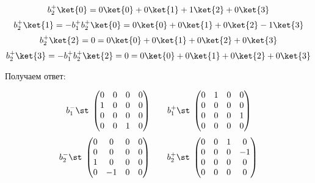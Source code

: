 \documentclass[12pt]{kiarticle}
\begin{document}
\begin{equation}\label{}
b^+_2\ket{0} =  0\ket{0} + 0\ket{1} + 1\ket{2} + 0\ket{3}
\end{equation}
%
\begin{equation}\label{}
b^+_2\ket{1} = -b^+_1b^+_2\ket{0} = 0\ket{0} + 0\ket{1} + 0\ket{2} - 1\ket{3}
\end{equation}
%
\begin{equation}\label{}
b^+_2\ket{2} = 0 = 0\ket{0} + 0\ket{1} + 0\ket{2} + 0\ket{3}
\end{equation}
%
\begin{equation}\label{}
b^+_2\ket{3} = -b^+_1b^+_2\ket{2} = 0 = 0\ket{0} + 0\ket{1} + 0\ket{2} + 0\ket{3}
\end{equation}

Получаем ответ:

\begin{equation}\label{}
b^-_1 \st \; \begin{pmatrix}
0 & 0 & 0 & 0 \\
1 & 0 & 0 & 0 \\ 
0 & 0 & 0 & 0 \\
0 & 0 & 1 & 0 \\
  \end{pmatrix} \; \; \;\quad 
b^+_1 \st \; \begin{pmatrix}
0 & 1 & 0 & 0 \\
0 & 0 & 0 & 0 \\ 
0 & 0 & 0 & 1 \\
0 & 0 & 0 & 0 \\
 \end{pmatrix}
\end{equation}
\begin{equation}\label{}
b^-_2 \st \; \begin{pmatrix}
0 & 0 & 0 & 0 \\
0 & 0 & 0 & 0 \\ 
1 & 0 & 0 & 0 \\
0 & -1 & 0 & 0 \\
\end{pmatrix} \; \; \;\quad 
b^+_2 \st \; \begin{pmatrix}
0 & 0 & 1 & 0 \\
0 & 0 & 0 & -1 \\ 
0 & 0 & 0 & 0 \\
0 & 0 & 0 & 0 \\
\end{pmatrix}
\end{equation}
\end{document}
